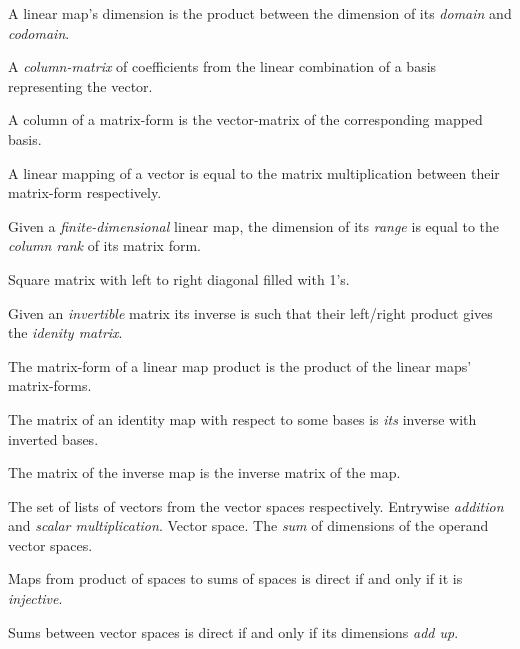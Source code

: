 \begin{multicols}{3}
  A linear map's dimension is the product between the dimension of its \textit{domain} and \textit{codomain}.

  A \textit{column-matrix} of coefficients from the linear combination of a basis representing the vector.

  A column of a matrix-form is the vector-matrix of the corresponding mapped basis.
  
  A linear mapping of a vector is equal to the matrix multiplication between their matrix-form respectively.
  
  Given a \textit{finite-dimensional} linear map,
  the dimension of its \textit{range} is equal to
  the \textit{column rank} of its matrix form.
  
  Square matrix with left to right diagonal filled with 1's.

  Given an \textit{invertible} matrix its inverse is such that their left/right product gives the \textit{idenity matrix}.

  The matrix-form of a linear map product is the product of the linear maps' matrix-forms.
  
  The matrix of an identity map with respect to some bases is
  \textit{its} inverse with inverted bases.
  
    
  The matrix of the inverse map is the inverse matrix of the map.


  The set of lists of vectors from the vector spaces respectively.
  Entrywise \textit{addition} and \textit{scalar multiplication}.
   Vector space.
  The \textit{sum} of dimensions of the operand vector spaces.

  Maps from product of spaces to sums of spaces is direct if and only if it is \textit{injective}.

  Sums between vector spaces is direct if and only if its dimensions \textit{add up}.


\end{multicols}
